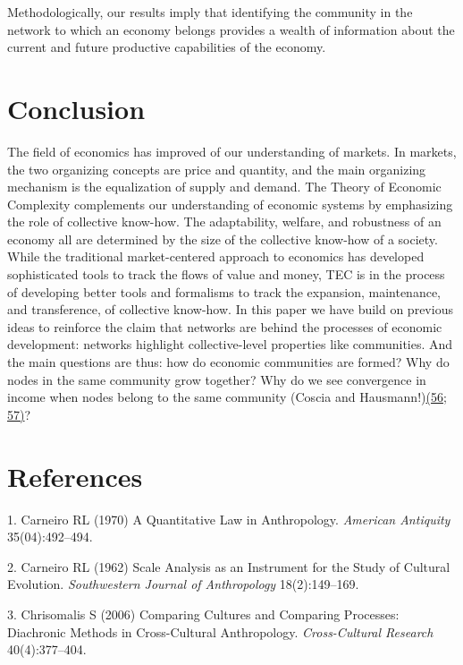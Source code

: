 \documentclass{pnastwo}
\begin{document}
\begin{article}
Methodologically, our results imply that identifying the community in
the network to which an economy belongs provides a wealth of information
about the current and future productive capabilities of the economy.

\par\null

\section{Conclusion}

{\label{269251}}

The field of economics has improved of our understanding of markets. In
markets, the two organizing concepts are price and quantity, and the
main organizing mechanism is the equalization of supply and demand. The
Theory of Economic Complexity complements our understanding of economic
systems by emphasizing the role of collective know-how. The
adaptability, welfare, and robustness of an economy all are determined
by the size of the collective know-how of a society. While the
traditional market-centered approach to economics has developed
sophisticated tools to track the flows of value and money, TEC is in the
process of developing better tools and formalisms to track the
expansion, maintenance, and transference, of collective know-how. In
this paper we have build on previous ideas to reinforce the claim that
networks are behind the processes of economic development: networks
highlight collective-level properties like communities. And the main
questions are thus: how do economic communities are formed? Why do nodes
in the same community grow together? Why do we see convergence in income
when nodes belong to the same community (Coscia and
Hausmann!)\hyperref[csl:56]{(56}; \hyperref[csl:57]{57)}?

\clearpage
\section*{References}\sloppy
{}
\label{csl:1}1. Carneiro RL (1970) {A Quantitative Law in Anthropology}. \textit{American Antiquity} 35(04):492–494.

\label{csl:2}2. Carneiro RL (1962) {Scale Analysis as an Instrument for the Study of Cultural Evolution}. \textit{Southwestern Journal of Anthropology} 18(2):149–169.

\label{csl:3}3. Chrisomalis S (2006) {Comparing Cultures and Comparing Processes: Diachronic Methods in Cross-Cultural Anthropology}. \textit{Cross-Cultural Research} 40(4):377–404.


\end{article}
\end{document}
